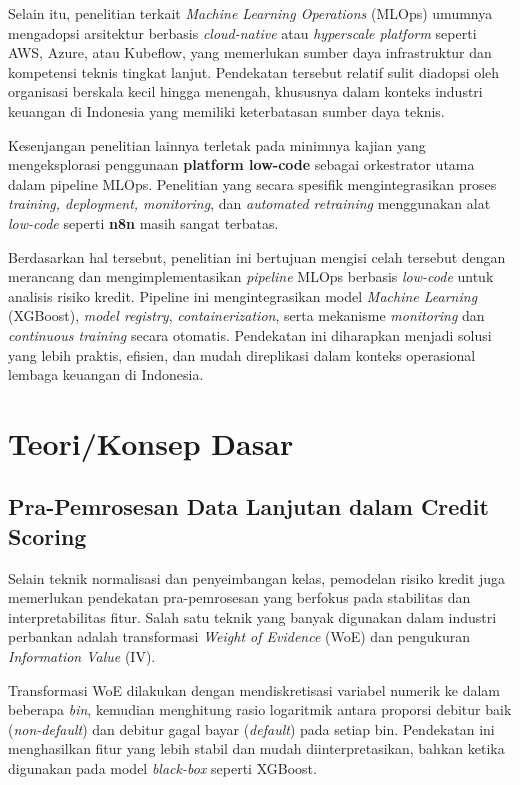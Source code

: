 Selain itu, penelitian terkait \textit{Machine Learning Operations} (MLOps) umumnya mengadopsi arsitektur berbasis \textit{cloud-native} atau \textit{hyperscale platform} seperti AWS, Azure, atau Kubeflow, yang memerlukan sumber daya infrastruktur dan kompetensi teknis tingkat lanjut. Pendekatan tersebut relatif sulit diadopsi oleh organisasi berskala kecil hingga menengah, khususnya dalam konteks industri keuangan di Indonesia yang memiliki keterbatasan sumber daya teknis.\cite{GoogleCloud2024}

Kesenjangan penelitian lainnya terletak pada minimnya kajian yang mengeksplorasi penggunaan \textbf{platform low-code} sebagai orkestrator utama dalam pipeline MLOps. Penelitian yang secara spesifik mengintegrasikan proses \textit{training, deployment, monitoring}, dan \textit{automated retraining} menggunakan alat \textit{low-code} seperti \textbf{n8n} masih sangat terbatas.

Berdasarkan hal tersebut, penelitian ini bertujuan mengisi celah tersebut dengan merancang dan mengimplementasikan \textit{pipeline} MLOps berbasis \textit{low-code} untuk analisis risiko kredit. Pipeline ini mengintegrasikan model \textit{Machine Learning} (XGBoost), \textit{model registry}, \textit{containerization}, serta mekanisme \textit{monitoring} dan \textit{continuous training} secara otomatis. Pendekatan ini diharapkan menjadi solusi yang lebih praktis, efisien, dan mudah direplikasi dalam konteks operasional lembaga keuangan di Indonesia. \cite{Sundberg2023}


\section{Teori/Konsep Dasar}

\subsection{Pra-Pemrosesan Data Lanjutan dalam Credit Scoring}

Selain teknik normalisasi dan penyeimbangan kelas, pemodelan risiko kredit juga memerlukan pendekatan pra-pemrosesan yang berfokus pada stabilitas dan interpretabilitas fitur. Salah satu teknik yang banyak digunakan dalam industri perbankan adalah transformasi \textit{Weight of Evidence} (WoE) dan pengukuran \textit{Information Value} (IV).\cite{venkatsai2025validation}

Transformasi WoE dilakukan dengan mendiskretisasi variabel numerik ke dalam beberapa \textit{bin}, kemudian menghitung rasio logaritmik antara proporsi debitur baik (\textit{non-default}) dan debitur gagal bayar (\textit{default}) pada setiap bin. Pendekatan ini menghasilkan fitur yang lebih stabil dan mudah diinterpretasikan, bahkan ketika digunakan pada model \textit{black-box} seperti XGBoost.\cite{ye2025unlocking}

